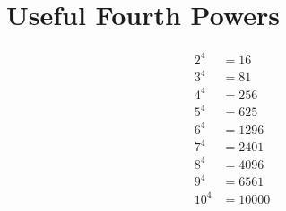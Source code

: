 
\section*{Useful Fourth Powers}
\begin{align*}
2^4  & = 16\\
3^4  & = 81\\
4^4  & = 256\\
5^4  & = 625\\
6^4  & = 1296\\
7^4  & = 2401\\
8^4  & = 4096\\
9^4  & = 6561\\
10^4 & = 10000
\end{align*}
